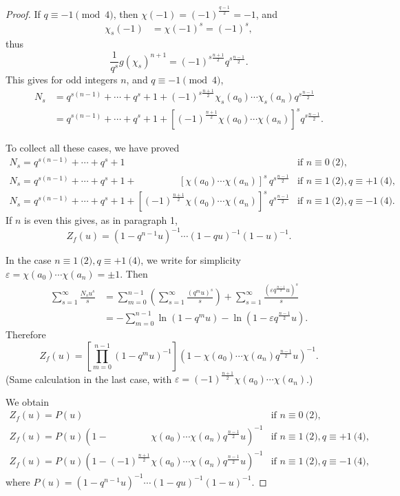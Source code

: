 \documentclass[11pt,a4paper]{article}
\begin{document}
\begin{proof}
If $q\equiv -1 \pmod 4$, then $\chi(-1) = (-1)^{\frac{q-1}{2}} = -1$, and
\begin{align*}
\chi_s(-1) &=\chi(-1)^s = (-1)^s,
\end{align*}
thus 
$$\frac{1}{q^s} g(\chi_s)^{n+1} = (-1)^{s \frac{n+1}{2}}q^{s \frac{n-1}{2}}.$$
This gives for odd integers $n$, and $q \equiv -1 \pmod 4$,
\begin{align*}
N_s &= q^{s(n-1)} + \cdots + q^s + 1 +  (-1)^{s \frac{n+1}{2}} \chi_s(a_0)\cdots \chi_s(a_n) q^{s \frac{n-1}{2}}\\
&=  q^{s(n-1)} + \cdots + q^s + 1 +  [(-1)^{ \frac{n+1}{2}} \chi(a_0)\cdots \chi(a_n)]^s q^{s \frac{n-1}{2}}.
\end{align*}


To collect all these cases, we have proved
$$
\begin{array}{ll}
N_s = q^{s(n-1)} + \cdots + q^s + 1 &\text{if  } n\equiv 0 \pod 2,\\
N_s = q^{s(n-1)} + \cdots + q^s + 1 + \phantom{(-1)^{ \frac{n+1}{2}}}[\chi(a_0)\cdots \chi(a_n)]^s\, q^{s\frac{n-1}{2}} &\text{if } n \equiv 1 \pod 2, q \equiv +1 \pod 4,\\
N_s = q^{s(n-1)} + \cdots + q^s + 1 +[(-1)^{ \frac{n+1}{2}} \chi(a_0)\cdots \chi(a_n)]^s\, q^{s \frac{n-1}{2}}& \text{if }n \equiv 1 \pod 2, q \equiv -1 \pod 4.
\end{array}
$$
If $n$ is even this gives, as in paragraph 1, 
$$Z_f(u)  = (1-q^{n-1}u)^{-1}\cdots (1-qu)^{-1}(1-u)^{-1}.$$


In the case $n \equiv 1 \pod 2, q \equiv +1 \pod 4$, we write for simplicity $\varepsilon = \chi(a_0)\cdots \chi(a_n) =\pm 1$.
Then 
\begin{align*}
\sum_{s=1}^\infty \frac{N_su^s}{s} &= \sum_{m=0}^{n-1}\left( \sum_{s=1}^\infty \frac{(q^m u)^s}{s} \right) + \sum_{s=1}^\infty \frac{ (\varepsilon q^\frac{n-1}{2} u)^s}{s}\\
&=  - \sum_{m=0}^{n-1} \ln(1-q^m u) -  \ln(1- \varepsilon q^\frac{n-1}{2}u).
\end{align*}
Therefore
$$Z_f(u) = \left[\prod_{m=0}^{n-1} (1 -q^mu)^{-1}\right] (1 - \chi(a_0)\cdots \chi(a_n) q^\frac{n-1}{2}u)^{-1}.$$
(Same calculation in the last case, with $\varepsilon = (-1)^{ \frac{n+1}{2}} \chi(a_0)\cdots \chi(a_n)$.)

We obtain
$$
\begin{array}{ll}
Z_f(u) = P(u)&\text{if  } n\equiv 0 \pod 2,\\
Z_f(u) = P(u)(1 - \phantom{ (-1)^\frac{n+1}{2}}\chi(a_0)\cdots \chi(a_n) q^\frac{n-1}{2}u)^{-1}&\text{if } n \equiv 1 \pod 2, q \equiv +1 \pod 4,\\
Z_f(u) = P(u)(1 - (-1)^\frac{n+1}{2}\chi(a_0)\cdots \chi(a_n) q^\frac{n-1}{2}u)^{-1}& \text{if }n \equiv 1 \pod 2, q \equiv -1 \pod 4,
\end{array}
$$
where $P(u) =  (1-q^{n-1}u)^{-1}\cdots (1-qu)^{-1}(1-u)^{-1}.$


\end{proof}
\end{document}
